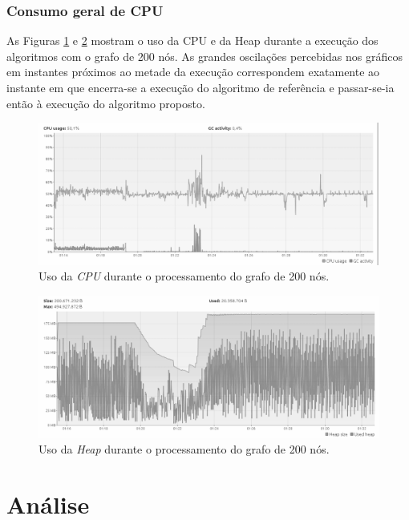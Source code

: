 \documentclass{acm_proc_article-sp}
\begin{document}
\subsubsection{Consumo geral de CPU}
As Figuras  \ref{cpu-usage} e \ref{heap-usage} mostram o uso da CPU e da Heap durante a execução dos algoritmos com
o grafo de 200 nós. As grandes oscilações percebidas nos gráficos em instantes próximos ao metade da execução
correspondem exatamente ao instante em que encerra-se a execução do algoritmo de referência e passar-se-ia então à
execução do algoritmo proposto.

\begin{figure}[h]%
\centering
\includegraphics[scale=.2]{img/CPU_usage-200_1000.png}
\caption{Uso da \textit{CPU} durante o processamento do grafo de 200 nós.}
\label{cpu-usage}
\end{figure}

\begin{figure}[h]%
\centering
\includegraphics[scale=.2]{img/MemoryHeap_Usage-200_1000.png}
\caption{Uso da \textit{Heap} durante o processamento do grafo de 200 nós.}
\label{heap-usage}
\end{figure}

\section{Análise}
\end{document}
